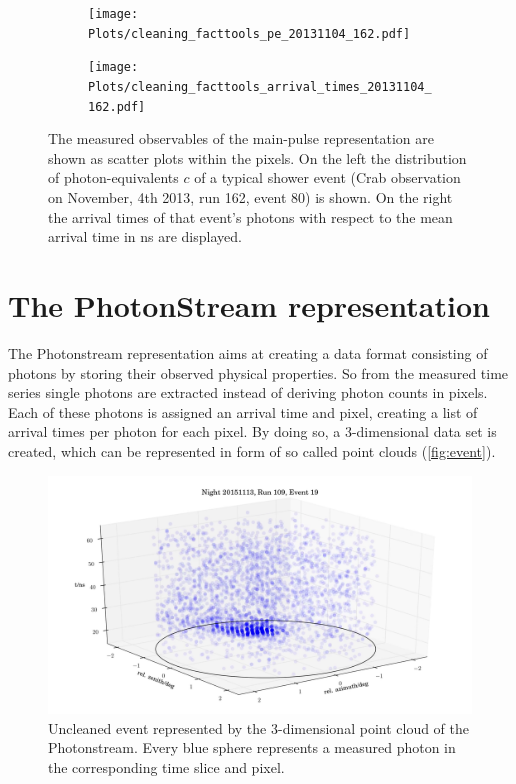 \begin{figure}
  \begin{subfigure}{0.475\textwidth}
    \texttt{[image: Plots/cleaning\_facttools\_pe\_20131104\_162.pdf]}
  \end{subfigure}
  \begin{subfigure}{0.475\textwidth}
    \texttt{[image: Plots/cleaning\_facttools\_arrival\_times\_20131104\_162.pdf]}
  \end{subfigure}
  \caption{The measured observables of the main-pulse representation are shown as scatter plots within the pixels. On the left the distribution of photon-equivalents $c$ of a typical shower event (Crab observation on November, 4th 2013, run 162, event 80) is shown. On the right the arrival times of that event's photons with respect to the mean arrival time in ns are displayed.}
  \label{fig:mainpulse}
\end{figure}

\section{The PhotonStream representation}

The Photonstream representation aims at creating a data format consisting of photons by storing their observed physical properties. So from the measured time series single photons are extracted instead of deriving photon counts in pixels. Each of these photons is assigned an arrival time and pixel, creating a list of arrival times per photon for each pixel. By doing so, a 3-dimensional data set is created, which can be represented in form of so called point clouds (\autoref{fig:event}).
%
\begin{figure}
  \centering
  \includegraphics[width=1.1\textwidth]{Plots/event2.png}
  \caption{Uncleaned event represented by the 3-dimensional point cloud of the Photonstream. Every blue sphere represents a measured photon in the corresponding time slice and pixel.}
  \label{fig:event}
\end{figure}

